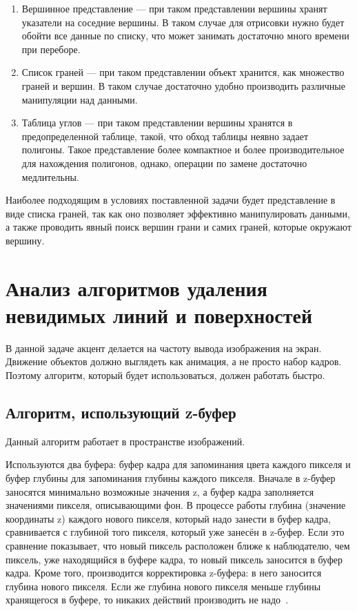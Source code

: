 \begin{enumerate}
	\item Вершинное представление --- при таком представлении вершины хранят указатели на соседние вершины. В таком случае для отрисовки нужно будет обойти все данные по списку, что может занимать достаточно много времени при переборе.
	\item Список граней --- при таком представлении объект хранится, как множество граней и вершин. В таком случае достаточно удобно производить различные манипуляции над данными.
	\item Таблица углов --- при таком представлении вершины хранятся в предопределенной таблице, такой, что обход таблицы неявно задает полигоны. Такое представление более компактное и более производительное для нахождения полигонов, однако, операции по замене достаточно медлительны.
\end{enumerate}

Наиболее подходящим в условиях поставленной задачи будет представление в виде списка граней, так как оно позволяет эффективно манипулировать данными, а также проводить явный поиск вершин грани и самих граней, которые окружают вершину.


\section{Анализ алгоритмов удаления невидимых линий и поверхностей}

В данной задаче акцент делается на частоту вывода изображения на экран. Движение объектов должно выглядеть как анимация, а не просто набор кадров. Поэтому алгоритм, который будет использоваться, должен работать быстро.

\subsection{Алгоритм, использующий z-буфер}
Данный алгоритм работает в пространстве изображений.

Используются два буфера: буфер кадра для запоминания цвета каждого пикселя и буфер глубины для запоминания глубины каждого пикселя. Вначале в z-буфер заносятся минимально возможные значения z, а буфер кадра заполняется значениями пикселя, описывающими фон. В процессе работы глубина (значение координаты z) каждого нового пикселя, который надо занести в буфер кадра, сравнивается с глубиной того пикселя, который уже занесён в z-буфер. Если это сравнение показывает, что новый пиксель расположен ближе к наблюдателю, чем пиксель, уже находящийся в буфере кадра, то новый пиксель заносится в буфер кадра. Кроме того, производится корректировка z-буфера: в него заносится глубина нового пикселя. Если же глубина нового пикселя меньше глубины хранящегося в буфере, то никаких действий производить не надо~\cite{rojers}.


